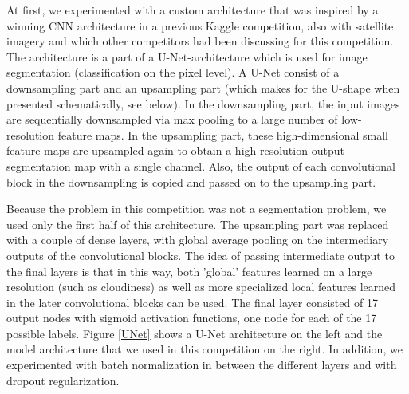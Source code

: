 \documentclass[fleqn]{homework}
\begin{document}
At first, we experimented with a custom architecture that was inspired by a winning CNN architecture in a previous Kaggle competition, also with satellite imagery and which other competitors had been discussing for this competition. The architecture is a part of a U-Net-architecture which is used for image segmentation (classification on the pixel level). A U-Net consist of a downsampling part and an upsampling part (which makes for the U-shape when presented schematically, see below). In the downsampling part, the input images are sequentially downsampled via max pooling to a large number of low-resolution feature maps. In the upsampling part, these high-dimensional small feature maps are upsampled again to obtain a high-resolution output segmentation map with a single channel. Also, the output of each convolutional block in the downsampling is copied and passed on to the upsampling part.

Because the problem in this competition was not a segmentation problem, we used only the first half of this architecture. The upsampling part was replaced with a couple of dense layers, with global average pooling on the intermediary outputs of the convolutional blocks. The idea of passing intermediate output to the final layers is that in this way, both 'global' features learned on a large resolution (such as cloudiness) as well as more specialized local features learned in the later convolutional blocks can be used. The final layer consisted of 17 output nodes with sigmoid activation functions, one node for each of the 17 possible labels. Figure \ref{UNet} shows a U-Net architecture on the left and the model architecture that we used in this competition on the right. In addition, we experimented with batch normalization in between the different layers and with dropout regularization.
\end{document}
